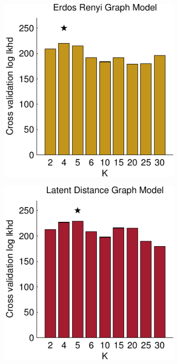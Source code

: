 \begin{figure}[!t]
\begin{subfigure}[T]{.24\linewidth}
\begin{center}
\end{center}
\end{subfigure}
\begin{subfigure}[T]{.24\linewidth}
\begin{center}
\includegraphics[width=\linewidth]{figures/ch2/icpsr_xv_er}
\end{center}
\end{subfigure}
\begin{subfigure}[T]{.24\linewidth}
\begin{center}
\includegraphics[width=\linewidth]{figures/ch2/icpsr_xv_dist}

\end{center}
\end{subfigure}
\end{figure}
